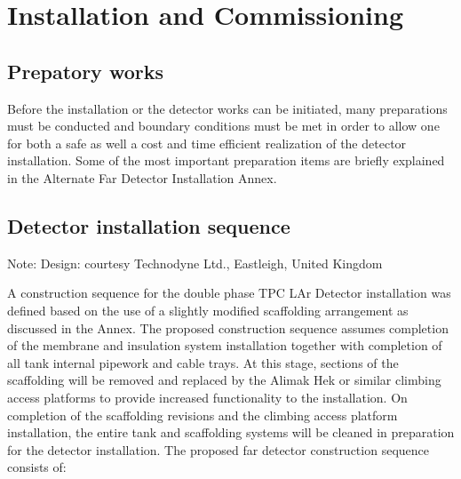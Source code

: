\section{Installation and Commissioning}
\label{sec:detectors-fd-alt-install}

\subsection{Prepatory works}

Before the installation or the detector works can be initiated, many preparations must be conducted and boundary conditions must be met in order to allow one for both a safe as well a cost and time efficient realization of the detector installation.  Some of the most important preparation items are briefly explained in the Alternate Far Detector Installation Annex.

\subsection{Detector installation sequence}
Note: Design: courtesy Technodyne Ltd., Eastleigh, United Kingdom

A construction sequence for the double phase TPC LAr Detector installation was defined based on the use of a slightly modified scaffolding arrangement as discussed in the Annex. The proposed construction sequence assumes completion of the membrane and insulation system installation together with completion of all tank internal pipework and cable trays.  At this stage, sections of the scaffolding will be removed and replaced by the Alimak Hek or similar climbing access platforms to provide increased functionality to the installation.  On completion of the scaffolding revisions and the climbing access platform installation, the entire tank and scaffolding systems will be cleaned in preparation for the detector installation.  The proposed far detector construction sequence consists of:

